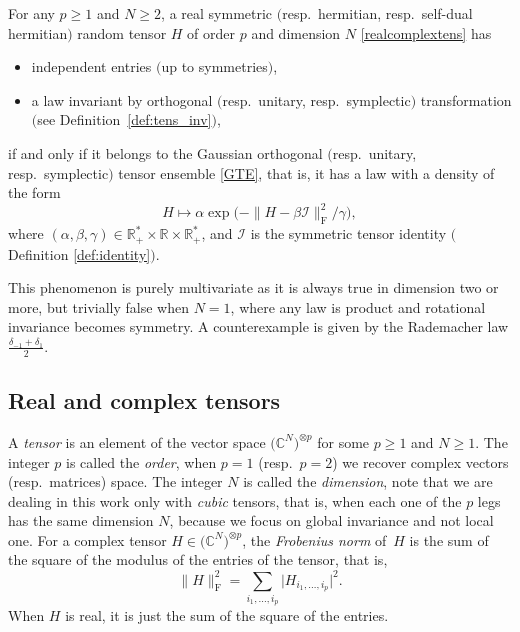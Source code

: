 \documentclass[pdftex]{sigma}
\numberwithin{equation}{section}
\theoremstyle{definition}
\begin{document}
\begin{theorem*}[main]
For any $p\geq 1$ and $N\geq 2$, a real symmetric $($resp.\ hermitian, resp.\ self-dual hermitian$)$ random tensor $H$ of order $p$ and dimension $N$ \eqref{realcomplextens} has
\begin{itemize}\itemsep=0pt
    \item[--] independent entries $($up to symmetries$)$,
    \item[--] a law invariant by orthogonal $($resp.\ unitary, resp.\ symplectic$)$ transformation $($see Definition~{\rm\ref{def:tens_inv}}$)$,
\end{itemize}
if and only if it belongs to the Gaussian orthogonal $($resp.\ unitary, resp.\ symplectic$)$ tensor ensemble \eqref{GTE}, that is, it has a law with a density of the form
\[ H \mapsto \alpha \exp \bigl( - \| H - \beta \mathcal{I} \|_{\mathrm{F}}^2 / \gamma \bigr),\]
where $(\alpha,\beta,\gamma) \in \mathbb{R}^*_+ \times \mathbb{R} \times \mathbb{R}^*_+$, and $\mathcal{I}$ is the symmetric tensor identity $($Definition {\rm\ref{def:identity}}$)$.
\end{theorem*}

This phenomenon is purely multivariate as it is always true in dimension two or more, but trivially false when $N=1$, where any law is product and rotational invariance becomes symmetry. A counterexample is given by the Rademacher law $\frac{\delta_{-1}+\delta_1}{2}$.

\subsection{Real and complex tensors}\label{realcomplextens}

A {\em tensor} is an element of the vector space $\bigl(\mathbb{C}^N\bigr)^{\otimes p}$ for some $p\geq 1$ and $N\geq 1$. The integer $p$ is called the {\em order}, when $p=1$ (resp.\ $p=2$) we recover complex vectors (resp.\ matrices) space. The integer $N$ is called the {\em dimension}, note that we are dealing in this work only with {\em cubic} tensors, that is, when each one of the $p$ legs has the same dimension $N$, because we focus on global invariance and not local one. For a complex tensor $H \in \bigl(\mathbb{C}^N\bigr)^{\otimes p}$, the {\em Frobenius norm} of~$H$ is the sum of the square of the modulus of the entries of the tensor, that is,
\[ \| H \|_{\mathrm{F}}^2= \sum_{i_1,\dots,i_p} \vert H_{i_1,\dots,i_p} \vert^2.\]
When $H$ is real, it is just the sum of the square of the entries.
\end{document}
